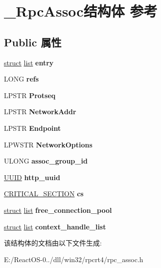 \hypertarget{struct___rpc_assoc}{}\section{\+\_\+\+Rpc\+Assoc结构体 参考}
\label{struct___rpc_assoc}
\subsection*{Public 属性}
\begin{DoxyCompactItemize}
\item 
\mbox{\label{struct___rpc_assoc_ac89af1f20ee99b294a1e758e49cc234c}} 
\hyperlink{interfacestruct}{struct} \hyperlink{classlist}{list} {\bfseries entry}
\item 
\mbox{\label{struct___rpc_assoc_a72f2fa810f99902ca00f0fda3e880c12}} 
L\+O\+NG {\bfseries refs}
\item 
\mbox{\label{struct___rpc_assoc_a9490dc882b9cc7555caa68fdd947d3f8}} 
L\+P\+S\+TR {\bfseries Protseq}
\item 
\mbox{\label{struct___rpc_assoc_afbd236af2cf3d9dd90ab6daf68e48eee}} 
L\+P\+S\+TR {\bfseries Network\+Addr}
\item 
\mbox{\label{struct___rpc_assoc_adb2e65f44fb051030dc39a78c99ff51b}} 
L\+P\+S\+TR {\bfseries Endpoint}
\item 
\mbox{\label{struct___rpc_assoc_ab5681ddce33184260135f78aaed7adf9}} 
L\+P\+W\+S\+TR {\bfseries Network\+Options}
\item 
\mbox{\label{struct___rpc_assoc_afa522b55ba6df61a3c74054a736d0cbe}} 
U\+L\+O\+NG {\bfseries assoc\+\_\+group\+\_\+id}
\item 
\mbox{\label{struct___rpc_assoc_a9d5e0111f18ce70e0f4857141de1519b}} 
\hyperlink{interface_g_u_i_d}{U\+U\+ID} {\bfseries http\+\_\+uuid}
\item 
\mbox{\label{struct___rpc_assoc_ac87bd56135e4ea88ab648fbbf3178ad2}} 
\hyperlink{struct___c_r_i_t_i_c_a_l___s_e_c_t_i_o_n}{C\+R\+I\+T\+I\+C\+A\+L\+\_\+\+S\+E\+C\+T\+I\+ON} {\bfseries cs}
\item 
\mbox{\label{struct___rpc_assoc_a2409ac9c3e01de200375e7be7b66c3cc}} 
\hyperlink{interfacestruct}{struct} \hyperlink{classlist}{list} {\bfseries free\+\_\+connection\+\_\+pool}
\item 
\mbox{\label{struct___rpc_assoc_a92bb0897e8fabe618ab4458498c378c5}} 
\hyperlink{interfacestruct}{struct} \hyperlink{classlist}{list} {\bfseries context\+\_\+handle\+\_\+list}
\end{DoxyCompactItemize}


该结构体的文档由以下文件生成\+:\begin{DoxyCompactItemize}
\item 
E\+:/\+React\+O\+S-\/0../dll/win32/rpcrt4/rpc\+\_\+assoc.\+h\end{DoxyCompactItemize}
